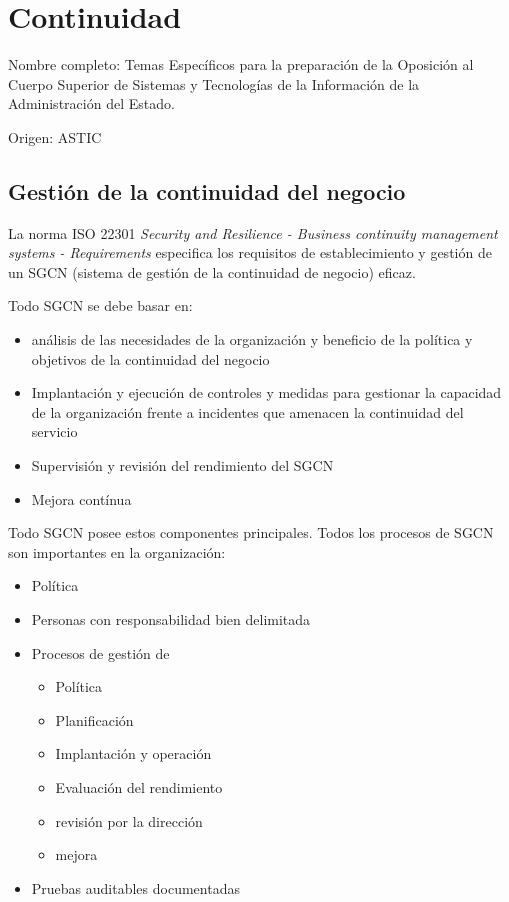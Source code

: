 \setcounter{section}{128}
\section{Continuidad}

Nombre completo: Temas Específicos para la preparación de la Oposición al Cuerpo Superior de Sistemas y Tecnologías de la Información de la Administración del Estado.

Origen: ASTIC

\localtableofcontents

\subsection{Gestión de la continuidad del negocio} %
    La norma ISO 22301 \textit{Security and Resilience - Business continuity management systems - Requirements} especifica los requisitos de establecimiento y gestión de un  SGCN (sistema de gestión de la continuidad de negocio) eficaz.

    Todo SGCN se debe basar en:
    \begin{itemize}
        \item análisis de las necesidades de la organización y beneficio de la política y objetivos de la continuidad del negocio
        \item Implantación y ejecución de controles y medidas para gestionar la capacidad de la organización frente a incidentes que amenacen la continuidad del servicio
        \item Supervisión y revisión del rendimiento del SGCN
        \item Mejora contínua
    \end{itemize}

    Todo SGCN posee estos componentes principales. Todos los procesos de SGCN son importantes en la organización:
    \begin{itemize}
        \item Política
        \item Personas con responsabilidad bien delimitada
        \item Procesos de gestión de \begin{itemize}
            \item Política
            \item Planificación
            \item Implantación y operación
            \item Evaluación del rendimiento
            \item revisión por la dirección
            \item mejora
        \end{itemize}
        \item Pruebas auditables documentadas
    \end{itemize}

